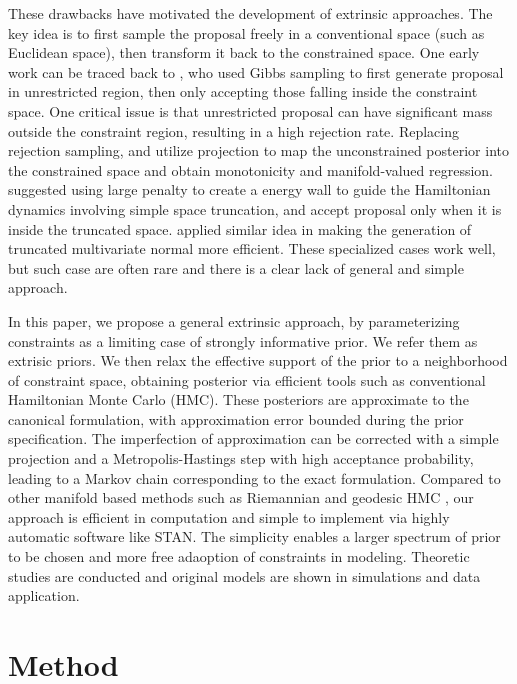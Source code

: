 \documentclass[10pt]{article}
\begin{document}
These drawbacks have motivated the development of extrinsic approaches. The key idea is to first sample the proposal freely in a conventional space (such as Euclidean space), then transform it back to the constrained space. One early work can be traced back to \cite{gelfand1992bayesian}, who used Gibbs sampling to first generate proposal in unrestricted region, then only accepting those falling inside the constraint space. One critical issue is that unrestricted proposal can have significant mass outside the constraint region, resulting in a high rejection rate. Replacing rejection sampling, \cite{lin2014monogp} and \cite{lin2016extrinsic} utilize projection to map the unconstrained posterior into the constrained space and obtain monotonicity and manifold-valued regression. \cite{neal2011mcmc} suggested using large penalty to create a energy wall to guide the Hamiltonian dynamics involving simple space truncation, and accept proposal only when it is inside the truncated space. \cite{pakman2014exact} applied similar idea in making the generation of truncated multivariate normal more efficient. These specialized cases work well, but such case are often rare and there is a clear lack of general and simple approach. 

In this paper, we propose a general extrinsic approach, by parameterizing constraints as a limiting case of strongly informative prior. We refer them as extrisic priors. We then relax the effective support of the prior to a neighborhood of constraint space, obtaining posterior via efficient tools such as conventional Hamiltonian Monte Carlo (HMC). These posteriors are approximate to the canonical formulation, with approximation error bounded during the prior specification. The imperfection of approximation can be corrected with a simple projection and a Metropolis-Hastings step with high acceptance probability, leading to a Markov chain corresponding to the exact formulation. Compared to other manifold based methods such as Riemannian and geodesic HMC \citep{girolami2011riemann,byrne2013geodesic}, our approach is efficient in computation and simple to implement via highly automatic software like STAN. The simplicity enables a larger spectrum of prior to be chosen and more free adaoption of constraints in modeling. Theoretic studies are conducted and original models are shown in simulations and data application.

\section{Method}
\end{document}
